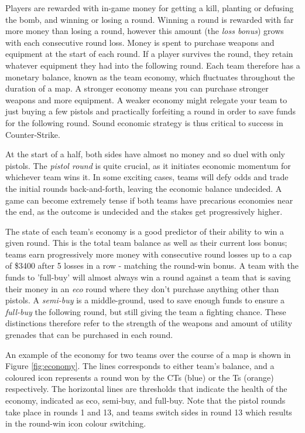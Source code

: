 Players are rewarded with in-game money for getting a kill, planting or defusing the bomb, and winning or losing a round. Winning a round is rewarded with far more money than losing a round, however this amount (the \textit{loss bonus}) grows with each consecutive round loss. Money is spent to purchase weapons and equipment at the start of each round. If a player survives the round, they retain whatever equipment they had into the following round. Each team therefore has a monetary balance, known as the team economy, which fluctuates throughout the duration of a map. A stronger economy means you can purchase stronger weapons and more equipment. A weaker economy might relegate your team to just buying a few pistols and practically forfeiting a round in order to save funds for the following round. Sound economic strategy is thus critical to success in Counter-Strike.

At the start of a half, both sides have almost no money and so duel with only pistols. The \textit{pistol round} is quite crucial, as it initiates economic momentum for whichever team wins it. In some exciting cases, teams will defy odds and trade the initial rounds back-and-forth, leaving the economic balance undecided. A game can become extremely tense if both teams have precarious economies near the end, as the outcome is undecided and the stakes get progressively higher. 

The state of each team's economy is a good predictor of their ability to win a given round. This is the total team balance as well as their current loss bonus; teams earn progressively more money with consecutive round losses up to a cap of \$3400 after 5 losses in a row - matching the round-win bonus. A team with the funds to 'full-buy' will almost always win a round against a team that is saving their money in an \textit{eco} round where  they don't purchase anything other than pistols. A \textit{semi-buy} is a middle-ground, used to save enough funds to ensure a \textit{full-buy} the following round, but still giving the team a fighting chance. These distinctions therefore refer to the strength of the weapons and amount of utility grenades that can be purchased in each round.

An example of the economy for two teams over the course of a map is shown in Figure \ref{fig:economy}. The lines corresponds to either team's balance, and a coloured icon represents a round won by the CTs (blue) or the Ts (orange) respectively. The horizontal lines are thresholds that indicate the health of the economy, indicated as eco, semi-buy, and full-buy. Note that the pistol rounds take place in rounds 1 and 13, and teams switch sides in round 13 which results in the round-win icon colour switching.

